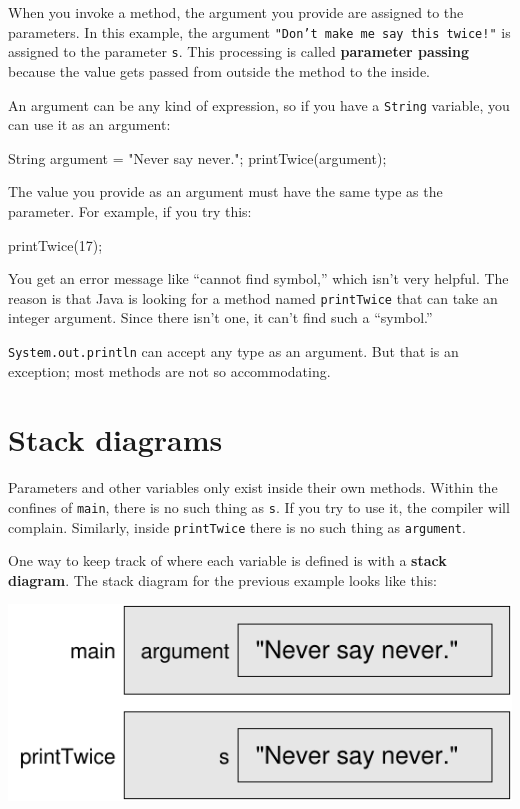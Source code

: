 When you invoke a method, the argument you provide are assigned to the
parameters.  In this example, the argument {\tt "Don't make me say this
  twice!"} is assigned to the parameter {\tt s}.  This processing
is called {\bf parameter passing} because the value gets passed
from outside the method to the inside.

An argument can be any kind of expression, so if you
have a {\tt String} variable, you can use it as an argument:

\begin{code}
    String argument = "Never say never.";
    printTwice(argument);
\end{code}
%
The value you provide as an argument must have the same type as
the parameter.  For example, if you try this:

\begin{code}
    printTwice(17);
\end{code}
%
You get an error message like ``cannot find symbol,'' which isn't very
helpful.  The reason is that Java is looking for a method named
{\tt printTwice} that can take an integer argument.  Since there
isn't one, it can't find such a ``symbol.''

{\tt System.out.println} can accept any
type as an argument.  But that is an exception; most methods
are not so accommodating.


\section{Stack diagrams}
\label{stack}

Parameters and other
variables only exist inside their own methods.  Within the
confines of {\tt main}, there is no such thing as {\tt s}.
If you try to use it, the compiler will complain.  Similarly,
inside {\tt printTwice} there is no such thing as {\tt argument}.

One way to keep track of where each variable is defined is
with a {\bf stack diagram}.  The stack diagram for the previous
example looks like this:

\includegraphics{figs/stack.pdf}

